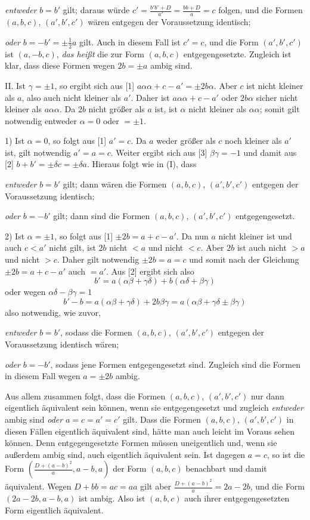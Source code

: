 \emph{entweder} $b=b'$ gilt; daraus würde $c'=\frac{b'b'+D}{a'}=\frac{bb+D}{a}=c$ folgen, und die Formen $(a,b,c)$, $(a',b',c')$ wären entgegen der Voraussetzung identisch;

\emph{oder} $b=-b'=\pm\frac12 a$ gilt. Auch in diesem Fall ist $c'=c$, und die Form $(a',b',c')$ ist $(a,-b,c)$, \emph{das heißt} die zur Form $(a,b,c)$ entgegengesetzte. Zugleich ist klar, dass diese Formen wegen $2b=\pm a$ ambig sind.

II. Ist $\gamma=\pm1$, so ergibt sich aus [1] $a\alpha\alpha+c-a'=\pm2b\alpha$. Aber $c$ ist nicht kleiner als $a$, also auch nicht kleiner als $a'$. Daher ist $a\alpha\alpha+c-a'$ oder $2b\alpha$ sicher nicht kleiner als $a\alpha\alpha$. Da $2b$ nicht größer als $a$ ist, ist $\alpha$ nicht kleiner als $\alpha\alpha$; somit gilt notwendig entweder $\alpha=0$ oder $=\pm1$.

1) Ist $\alpha=0$, so folgt aus [1] $a'=c$. Da $a$ weder größer als $c$ noch kleiner als $a'$ ist, gilt notwendig $a'=a=c$. Weiter ergibt sich aus [3] $\beta\gamma=-1$ und damit aus [2] $b+b'=\pm\delta c=\pm\delta a$. Hieraus folgt wie in (I), dass

\emph{entweder} $b=b'$ gilt; dann wären die Formen $(a,b,c)$, $(a',b',c')$ entgegen der Voraussetzung identisch;

\emph{oder} $b=-b'$ gilt; dann sind die Formen $(a,b,c)$, $(a',b',c')$ entgegengesetzt.

2) Ist $\alpha=\pm1$, so folgt aus [1] $\pm2b=a+c-a'$. Da nun $a$ nicht kleiner ist und auch $c<a'$ nicht gilt, ist $2b$ nicht $<a$ und nicht $<c$. Aber $2b$ ist auch nicht $>a$ und nicht $>c$. Daher gilt notwendig $\pm2b=a=c$ und somit nach der Gleichung $\pm2b=a+c-a'$ auch $=a'$. Aus [2] ergibt sich also
\[
b'=a(\alpha\beta+\gamma\delta)+b(\alpha\delta+\beta\gamma)
\]
oder wegen $\alpha\delta-\beta\gamma=1$
\[
b'-b=a(\alpha\beta+\gamma\delta)+2b\beta\gamma=a(\alpha\beta+\gamma\delta\pm\beta\gamma)
\]
also notwendig, wie zuvor,

\emph{entweder} $b=b'$, sodass die Formen $(a,b,c)$, $(a',b',c')$ entgegen der Voraussetzung identisch wären;

\emph{oder} $b=-b'$, sodass jene Formen entgegengesetzt sind. Zugleich sind die Formen in diesem Fall wegen $a=\pm2b$ ambig.

Aus allem zusammen folgt, dass die Formen $(a,b,c)$, $(a',b',c')$ nur dann eigentlich äquivalent sein können, wenn sie entgegengesetzt und zugleich \emph{entweder} ambig sind \emph{oder} $a=c=a'=c'$ gilt.
Dass die Formen $(a,b,c)$, $(a',b',c')$ in diesen Fällen eigentlich äquivalent sind, hätte man auch leicht im Voraus sehen können. Denn entgegengesetzte Formen müssen uneigentlich und, wenn sie außerdem ambig sind, auch eigentlich äquivalent sein. Ist dagegen $a=c$, so ist die Form $(\frac{D+(a-b)^2}{a},a-b,a)$ der Form $(a,b,c)$ benachbart und damit äquivalent. Wegen $D+bb=ac=aa$ gilt aber $\frac{D+(a-b)^2}{a}=2a-2b$, und die Form $(2a-2b,a-b,a)$ ist ambig. Also ist $(a,b,c)$ auch ihrer entgegengesetzten Form eigentlich äquivalent.

